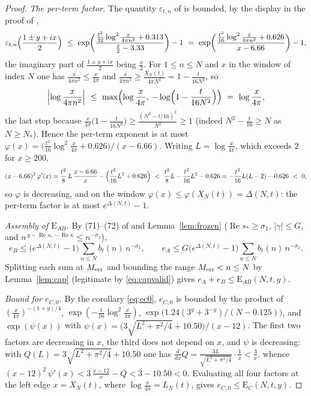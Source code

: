 \documentclass[11pt]{article}
\theoremstyle{definition}
\newcommand{\eps}{\varepsilon}
\DeclareMathOperator{\Rea}{Re}
\begin{document}
\begin{proof}
\emph{The per-term factor.} The quantity $\eps_{t,n}$ of
\cite[(44)]{Polymath} is bounded, by the display in the proof of
\cite[Proposition~6.6(iv),(v)]{Polymath},
\[
\eps_{t,n}\Bigl(\frac{1\pm y+ix}2\Bigr)
\ \le\
\exp\biggl(
\frac{\frac{t^2}{32}\log^2\frac{x}{4\pi n^2}+0.313}
{\frac x2-3.33}
\biggr)-1
\ =\
\exp\biggl(
\frac{\frac{t^2}{16}\log^2\frac{x}{4\pi n^2}+0.626}{x-6.66}
\biggr)-1 ,
\]
the imaginary part of $\frac{1\pm y+ix}2$ being $\frac x2$. For
$1\le n\le N$ and $x$ in the window of index $N$ one has
$\frac{x}{4\pi n^2}\le\frac{x}{4\pi}$ and
$\frac{x}{4\pi n^2}\ge\frac{X_N(t)}{4\pi N^2}
=1-\frac t{16N^2}$, so
\[
\Bigl|\log\frac{x}{4\pi n^2}\Bigr|
\ \le\ \max\Bigl(\log\frac x{4\pi},
\,-\log\Bigl(1-\frac t{16N^2}\Bigr)\Bigr)
\ =\ \log\frac x{4\pi},
\]
the last step because
$\frac x{4\pi}\bigl(1-\frac t{16N^2}\bigr)
\ge\frac{(N^2-t/16)^2}{N^2}\ge1$ (indeed
$N^2-\frac t{16}\ge N$ as $N\ge N_*$). Hence the per-term
exponent is at most
$\varphi(x)
=\bigl(\frac{t^2}{16}\log^2\frac x{4\pi}+0.626\bigr)/(x-6.66)$.
Writing $L=\log\frac x{4\pi}$, which exceeds $2$ for $x\ge200$,
\[
(x-6.66)^2\,\varphi'(x)
=\frac{t^2}{8}\,L\,\frac{x-6.66}{x}
-\Bigl(\frac{t^2}{16}L^2+0.626\Bigr)
\ <\ \frac{t^2}{8}L-\frac{t^2}{16}L^2-0.626
=-\frac{t^2}{16}L(L-2)-0.626\ <\ 0,
\]
so $\varphi$ is decreasing, and on the window
$\varphi(x)\le\varphi(X_N(t))=\Delta(N,t)$: the per-term factor
is at most $e^{\Delta(N,t)}-1$.

\emph{Assembly of $\mathrm{E}_{AB}$.} By (71)--(72) of
\cite{Polymath} and Lemma~\ref{lem:frozen}
($\Rea s_*\ge\sigma_1$, $|\gamma|\le G$, and
$n^{\,y-\Rea s_*-\Rea\kappa}\le n^{-\sigma_2}$),
\[
e_B\le\bigl(e^{\Delta(N,t)}-1\bigr)
\sum_{n\le N}b_t(n)\,n^{-\sigma_1},
\qquad
e_A\le G\bigl(e^{\Delta(N,t)}-1\bigr)
\sum_{n\le N}b_t(n)\,n^{-\sigma_2}.
\]
Splitting each sum at $M_{\rm err}$ and bounding the range
$M_{\rm err}<n\le N$ by Lemma~\ref{lem:cap} (legitimate by
\eqref{eq:capvalid}) gives
$e_A+e_B\le\mathrm{E}_{AB}(N,t,y)$.

\emph{Bound for $e_{C,0}$.} By the corollary \eqref{eq:ec0},
$e_{C,0}$ is bounded by the product of
$(\frac x{4\pi})^{-(1+y)/4}$,
$\exp(-\frac t{16}\log^2\frac x{4\pi})$,
$\exp\bigl(1.24(3^y+3^{-y})/(N-0.125)\bigr)$, and
$\exp(\psi(x))$ with
$\psi(x)=\bigl(3\sqrt{L^2+\pi^2/4}+10.50\bigr)/(x-12)$. The
first two factors are decreasing in $x$, the third does not depend
on $x$, and $\psi$ is decreasing: with
$Q(L)=3\sqrt{L^2+\pi^2/4}+10.50$ one has
$\frac{d}{dx}Q=\frac{3L}{\sqrt{L^2+\pi^2/4}}\cdot\frac1x
<\frac3x$, whence
$(x-12)^2\,\psi'(x)<3\,\frac{x-12}x-Q<3-10.50<0$. Evaluating
all four factors at the left edge $x=X_N(t)$, where
$\log\frac x{4\pi}=L_N(t)$, gives
$e_{C,0}\le\mathrm{E}_{C}(N,t,y)$.


\end{proof}
\end{document}
